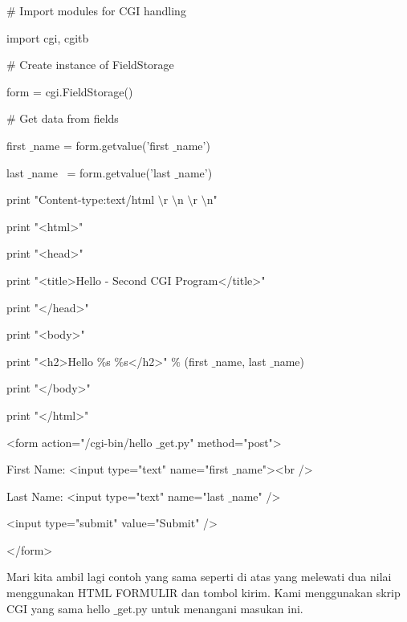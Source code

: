 \begin {enumerate}
\noindent 
 $  \#  $ Import modules for CGI handling  \par
\noindent 
import cgi, cgitb  \par
\vspace{12pt}
\noindent 
 $  \#  $ Create instance of FieldStorage  \par
\noindent 
form = cgi.FieldStorage()  \par
\vspace{12pt}
\noindent 
 $  \#  $ Get data from fields \par
\noindent 
first $  \_  $name = form.getvalue('first $  \_  $name') \par
\noindent 
last $  \_  $name~ = form.getvalue('last $  \_  $name') \par
\vspace{12pt}
\noindent 
print "Content-type:text/html $  \setminus  $r $  \setminus  $n $  \setminus  $r $  \setminus  $n" \par
\noindent 
print "<html>" \par
\noindent 
print "<head>" \par
\noindent 
print "<title>Hello - Second CGI Program</title>" \par
\noindent 
print "</head>" \par
\noindent 
print "<body>" \par
\noindent 
print "<h2>Hello  $  \%  $s  $  \%  $s</h2>"  $  \%  $ (first $  \_  $name, last $  \_  $name) \par
\noindent 
print "</body>" \par
\noindent 
print "</html>" \par
\vspace{12pt}
\noindent 
<form action="/cgi-bin/hello $  \_  $get.py" method="post"> \par
\noindent 
First Name: <input type="text" name="first $  \_  $name"><br /> \par
\noindent 
Last Name: <input type="text" name="last $  \_  $name" /> \par
\vspace{12pt}
\noindent 
<input type="submit" value="Submit" /> \par
\noindent 
</form> \par
\vspace{12pt}
Mari kita ambil lagi contoh yang sama seperti di atas yang melewati dua nilai menggunakan HTML FORMULIR dan tombol kirim. Kami menggunakan skrip CGI yang sama hello $  \_  $get.py untuk menangani masukan ini. \par
\noindent 

\end{enumerate}
